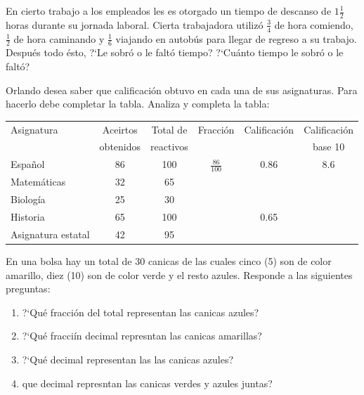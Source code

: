 \documentclass[11pt]{article}
\begin{document}
\vspace{1cm}

En cierto trabajo a los empleados les es otorgado un tiempo de
descanso de $1\frac{1}{2}$ horas durante su jornada laboral. Cierta trabajadora
utiliz\'o $\frac{3}{4}$ de hora comiendo, $\frac{1}{2}$ de hora caminando y
$\frac{1}{6}$ viajando en autob\'us para llegar de regreso a su trabajo.
Despu\'es todo \'esto, ?`Le sobr\'o o le falt\'o tiempo? ?`Cu\'anto tiempo le
sobr\'o o le falt\'o?

\vspace{1cm}

Orlando desea saber que calificaci\'on obtuvo en cada una de sus
asignaturas. Para hacerlo debe completar la tabla. Analiza y completa la tabla:

\vspace{1cm}

\begin{center}
\begin{tabular}{|l|c|c|c|c|c|}
\hline
\hline
Asignatura & Aceirtos  & Total de  & Fracci\'on & Calificaci\'on & Calificaci\'on \\
           & obtenidos & reactivos &            &                & base 10 \\
\hline
\hline
Espa\~nol & 86 & 100 & $\displaystyle\frac{86}{100}$ & 0.86 & 8.6 \\ 
\hline
Matem\'aticas & 32 & 65 &&&\\
\hline
Biolog\'ia & 25 & 30 &&&\\
\hline
Historia & 65 & 100 && 0.65 & \\
\hline
Asignatura estatal & 42 & 95 &&&\\ 
\hline 
\hline 
\end{tabular}
\end{center}


\vspace{1cm}

En una bolsa hay un total de 30 canicas de las cuales cinco (5) son de
color amarillo, diez (10) son de color verde y el resto azules. Responde a las
siguientes preguntas:

\begin{enumerate}[label=\alph*)] \itemsep-.3em
\item ?`Qu\'e fracci\'on del total representan las canicas azules?
\item ?`Qu\'e fracci\'in decimal represntan las canicas amarillas?
\item ?`Qu\'e decimal representan las las canicas azules?
\item que decimal represntan las canicas verdes y azules juntas?
\end{enumerate}
\end{document}
